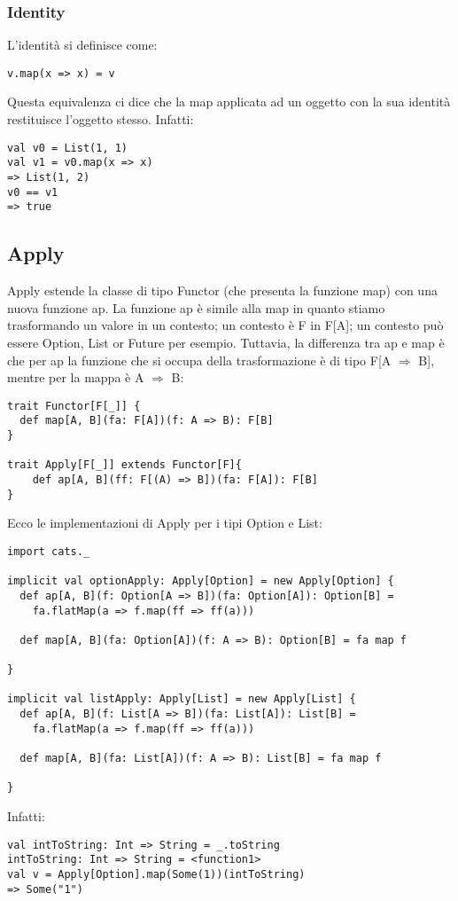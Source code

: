 \subsubsection{Identity}
L'identità si definisce come:
\begin{verbatim}
v.map(x => x) = v
\end{verbatim}
\noindent Questa equivalenza ci dice che la map applicata ad un oggetto con la sua identità restituisce l'oggetto stesso. Infatti:
\begin{verbatim}
val v0 = List(1, 1)
val v1 = v0.map(x => x)
=> List(1, 2)
v0 == v1
=> true
 \end{verbatim}

\subsection{Apply}
Apply estende la classe di tipo Functor (che presenta la funzione map) con una nuova funzione ap. La funzione ap è simile alla map in quanto stiamo trasformando un valore in un contesto; un contesto è F in F[A]; un contesto può essere Option, List or Future per esempio. Tuttavia, la differenza tra ap e map è che per ap la funzione che si occupa della trasformazione è di tipo F[A $\Rightarrow$ B], mentre per la mappa è A $\Rightarrow$ B:
\begin{verbatim}
trait Functor[F[_]] {
  def map[A, B](fa: F[A])(f: A => B): F[B]
}

trait Apply[F[_]] extends Functor[F]{
    def ap[A, B](ff: F[(A) => B])(fa: F[A]): F[B]
}
\end{verbatim}
Ecco le implementazioni di Apply per i tipi Option e List:
\begin{verbatim}
import cats._

implicit val optionApply: Apply[Option] = new Apply[Option] {
  def ap[A, B](f: Option[A => B])(fa: Option[A]): Option[B] =
    fa.flatMap(a => f.map(ff => ff(a)))

  def map[A, B](fa: Option[A])(f: A => B): Option[B] = fa map f

}

implicit val listApply: Apply[List] = new Apply[List] {
  def ap[A, B](f: List[A => B])(fa: List[A]): List[B] =
    fa.flatMap(a => f.map(ff => ff(a)))

  def map[A, B](fa: List[A])(f: A => B): List[B] = fa map f

}
\end{verbatim}

\noindent Infatti:
\begin{verbatim}
val intToString: Int => String = _.toString
intToString: Int => String = <function1>
val v = Apply[Option].map(Some(1))(intToString) 
=> Some("1")
    
\end{verbatim}
